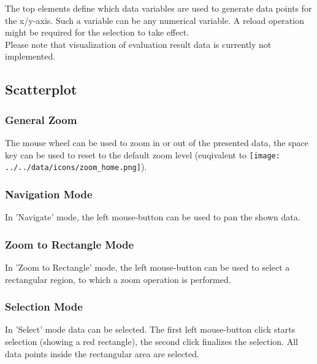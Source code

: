 The top elements define which data variables are used to generate data points for the x/y-axis. Such a variable can be any numerical variable. A reload operation might be required for the selection to take effect. \\

Please note that visualization of evaluation result data is currently not implemented.

\subsection{Scatterplot}

\subsubsection{General Zoom}

The mouse wheel can be used to zoom in or out of the presented data, the space key can be used to reset to the default zoom level (euqivalent to \texttt{[image: ../../data/icons/zoom\_home.png]}).

\subsubsection{Navigation Mode}

In 'Navigate' mode, the left mouse-button can be used to pan the shown data.

\subsubsection{Zoom to Rectangle Mode}

In 'Zoom to Rectangle' mode, the left mouse-button can be used to select a rectangular region, to which a zoom operation is performed.

\subsubsection{Selection Mode}

In 'Select' mode data can be selected. The first left mouse-button click starts selection (showing a red rectangle), the second click finalizes the selection. All data points inside the rectangular area are selected.


